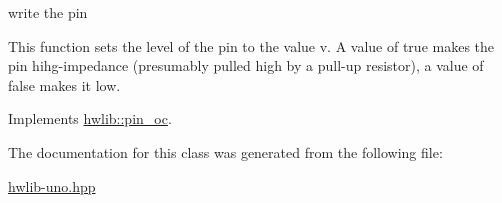 write the pin 

This function sets the level of the pin to the value v. A value of true makes the pin hihg-\/impedance (presumably pulled high by a pull-\/up resistor), a value of false makes it low. 

Implements \hyperlink{classhwlib_1_1pin__oc_a2165622dad253a423d2fa52cbed7c553}{hwlib\+::pin\+\_\+oc}.



The documentation for this class was generated from the following file\+:\begin{DoxyCompactItemize}
\item 
\hyperlink{hwlib-uno_8hpp}{hwlib-\/uno.\+hpp}\end{DoxyCompactItemize}
